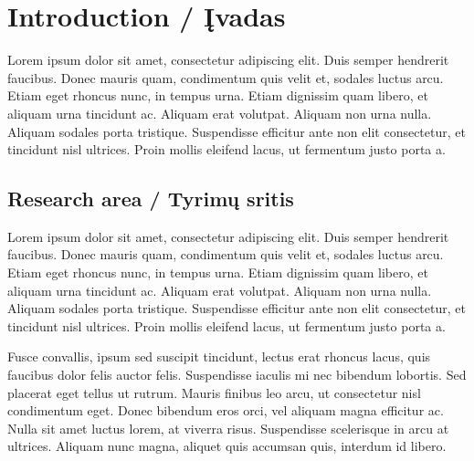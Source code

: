     

\chapter*{Introduction / Įvadas}
\label{cha:intro}

Lorem ipsum dolor sit amet, consectetur adipiscing elit. Duis semper hendrerit faucibus. Donec mauris quam, condimentum quis velit et, sodales luctus arcu. Etiam eget rhoncus nunc, in tempus urna. Etiam dignissim quam libero, et aliquam urna tincidunt ac. Aliquam erat volutpat. Aliquam non urna nulla. Aliquam sodales porta tristique. Suspendisse efficitur ante non elit consectetur, et tincidunt nisl ultrices. Proin mollis eleifend lacus, ut fermentum justo porta a.

\section*{Research area / Tyrimų sritis}

Lorem ipsum dolor sit amet, consectetur adipiscing elit. Duis semper hendrerit faucibus. Donec mauris quam, condimentum quis velit et, sodales luctus arcu. Etiam eget rhoncus nunc, in tempus urna. Etiam dignissim quam libero, et aliquam urna tincidunt ac. Aliquam erat volutpat. Aliquam non urna nulla. Aliquam sodales porta tristique. Suspendisse efficitur ante non elit consectetur, et tincidunt nisl ultrices. Proin mollis eleifend lacus, ut fermentum justo porta a.

Fusce convallis, ipsum sed suscipit tincidunt, lectus erat rhoncus lacus, quis faucibus dolor felis auctor felis. Suspendisse iaculis mi nec bibendum lobortis. Sed placerat eget tellus ut rutrum. Mauris finibus leo arcu, ut consectetur nisl condimentum eget. Donec bibendum eros orci, vel aliquam magna efficitur ac. Nulla sit amet luctus lorem, at viverra risus. Suspendisse scelerisque in arcu at ultrices. Aliquam nunc magna, aliquet quis 
accumsan quis, interdum id libero.

